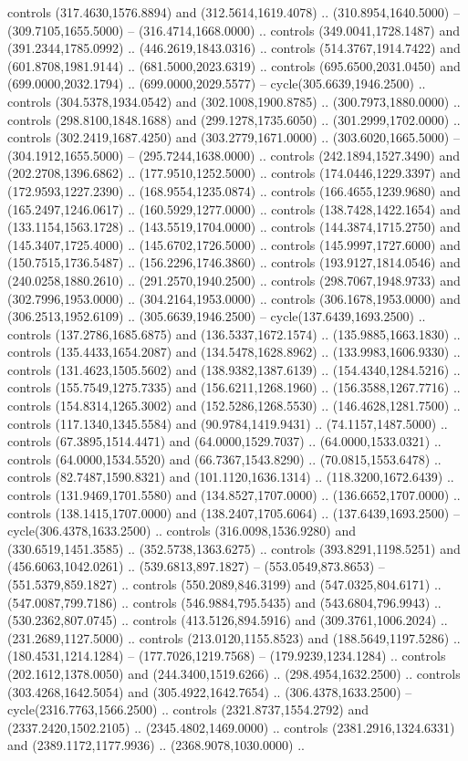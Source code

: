 controls (317.4630,1576.8894) and (312.5614,1619.4078) .. (310.8954,1640.5000) -- (309.7105,1655.5000) -- (316.4714,1668.0000) .. controls (349.0041,1728.1487) and (391.2344,1785.0992) .. (446.2619,1843.0316) .. controls (514.3767,1914.7422) and (601.8708,1981.9144) .. (681.5000,2023.6319) .. controls (695.6500,2031.0450) and (699.0000,2032.1794) .. (699.0000,2029.5577) -- cycle(305.6639,1946.2500) .. controls (304.5378,1934.0542) and (302.1008,1900.8785) .. (300.7973,1880.0000) .. controls (298.8100,1848.1688) and (299.1278,1735.6050) .. (301.2999,1702.0000) .. controls (302.2419,1687.4250) and (303.2779,1671.0000) .. (303.6020,1665.5000) -- (304.1912,1655.5000) -- (295.7244,1638.0000) .. controls (242.1894,1527.3490) and (202.2708,1396.6862) .. (177.9510,1252.5000) .. controls (174.0446,1229.3397) and (172.9593,1227.2390) .. (168.9554,1235.0874) .. controls (166.4655,1239.9680) and (165.2497,1246.0617) .. (160.5929,1277.0000) .. controls (138.7428,1422.1654) and (133.1154,1563.1728) .. (143.5519,1704.0000) .. controls (144.3874,1715.2750) and (145.3407,1725.4000) .. (145.6702,1726.5000) .. controls (145.9997,1727.6000) and (150.7515,1736.5487) .. (156.2296,1746.3860) .. controls (193.9127,1814.0546) and (240.0258,1880.2610) .. (291.2570,1940.2500) .. controls (298.7067,1948.9733) and (302.7996,1953.0000) .. (304.2164,1953.0000) .. controls (306.1678,1953.0000) and (306.2513,1952.6109) .. (305.6639,1946.2500) -- cycle(137.6439,1693.2500) .. controls (137.2786,1685.6875) and (136.5337,1672.1574) .. (135.9885,1663.1830) .. controls (135.4433,1654.2087) and (134.5478,1628.8962) .. (133.9983,1606.9330) .. controls (131.4623,1505.5602) and (138.9382,1387.6139) .. (154.4340,1284.5216) .. controls (155.7549,1275.7335) and (156.6211,1268.1960) .. (156.3588,1267.7716) .. controls (154.8314,1265.3002) and (152.5286,1268.5530) .. (146.4628,1281.7500) .. controls (117.1340,1345.5584) and (90.9784,1419.9431) .. (74.1157,1487.5000) .. controls (67.3895,1514.4471) and (64.0000,1529.7037) .. (64.0000,1533.0321) .. controls (64.0000,1534.5520) and (66.7367,1543.8290) .. (70.0815,1553.6478) .. controls (82.7487,1590.8321) and (101.1120,1636.1314) .. (118.3200,1672.6439) .. controls (131.9469,1701.5580) and (134.8527,1707.0000) .. (136.6652,1707.0000) .. controls (138.1415,1707.0000) and (138.2407,1705.6064) .. (137.6439,1693.2500) -- cycle(306.4378,1633.2500) .. controls (316.0098,1536.9280) and (330.6519,1451.3585) .. (352.5738,1363.6275) .. controls (393.8291,1198.5251) and (456.6063,1042.0261) .. (539.6813,897.1827) -- (553.0549,873.8653) -- (551.5379,859.1827) .. controls (550.2089,846.3199) and (547.0325,804.6171) .. (547.0087,799.7186) .. controls (546.9884,795.5435) and (543.6804,796.9943) .. (530.2362,807.0745) .. controls (413.5126,894.5916) and (309.3761,1006.2024) .. (231.2689,1127.5000) .. controls (213.0120,1155.8523) and (188.5649,1197.5286) .. (180.4531,1214.1284) -- (177.7026,1219.7568) -- (179.9239,1234.1284) .. controls (202.1612,1378.0050) and (244.3400,1519.6266) .. (298.4954,1632.2500) .. controls (303.4268,1642.5054) and (305.4922,1642.7654) .. (306.4378,1633.2500) -- cycle(2316.7763,1566.2500) .. controls (2321.8737,1554.2792) and (2337.2420,1502.2105) .. (2345.4802,1469.0000) .. controls (2381.2916,1324.6331) and (2389.1172,1177.9936) .. (2368.9078,1030.0000) .. 